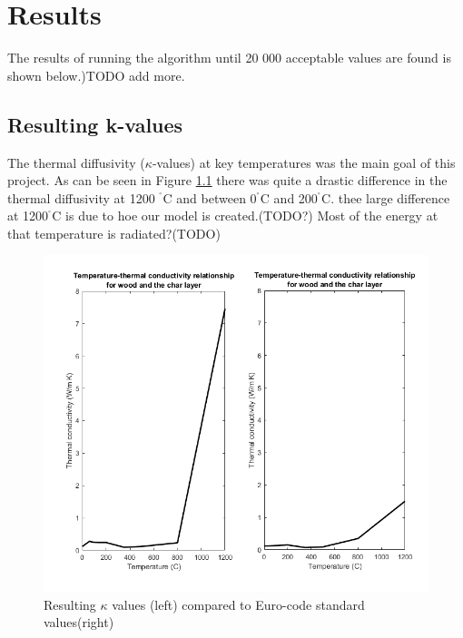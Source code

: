 \chapter{Results} \label{results}

The results of running the algorithm until 20 000 acceptable values are found is shown below.)TODO add more.
\section{Resulting k-values}
The thermal diffusivity ($\kappa$-values) at key temperatures was the main goal of this project. 
As can be seen in Figure \ref{kresult_euro_fig} there was quite a drastic difference in the thermal diffusivity at 1200 $^{^\circ}$C and between 0$^{^\circ}$C and 200$^{^\circ}$C.
thee large difference at 1200$^{^\circ}$C is due to hoe our model is created.(TODO?)
Most of the energy at that temperature is radiated?(TODO)
\begin{figure}[H]
	\label{kresult_euro_fig}
	\includegraphics[width=\linewidth]{figures/euro_and_results.png}
	\caption{Resulting $\kappa$ values (left) compared to Euro-code standard values(right)}
\end{figure}


